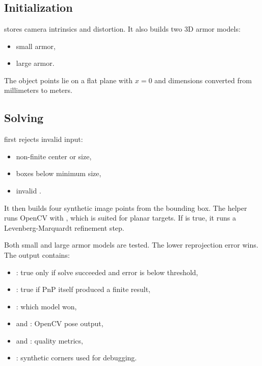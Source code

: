 \section{}

\subsection{Initialization}

 stores camera intrinsics and distortion. It also builds
two 3D armor models:

\begin{itemize}
  \item small armor,
  \item large armor.
\end{itemize}

The object points lie on a flat plane with $x=0$ and dimensions converted from
millimeters to meters.

\subsection{Solving}

 first rejects invalid input:

\begin{itemize}
  \item non-finite center or size,
  \item boxes below minimum size,
  \item invalid .
\end{itemize}

It then builds four synthetic image points from the bounding box. The helper
 runs OpenCV  with , which
is suited for planar targets. If  is true, it runs a
Levenberg-Marquardt refinement step.

Both small and large armor models are tested. The lower reprojection error
wins. The output  contains:

\begin{itemize}
  \item {}: true only if solve succeeded and error is below threshold,
  \item {}: true if PnP itself produced a finite result,
  \item {}: which model won,
  \item {} and : OpenCV pose output,
  \item {} and : quality metrics,
  \item {}: synthetic corners used for debugging.
\end{itemize}

